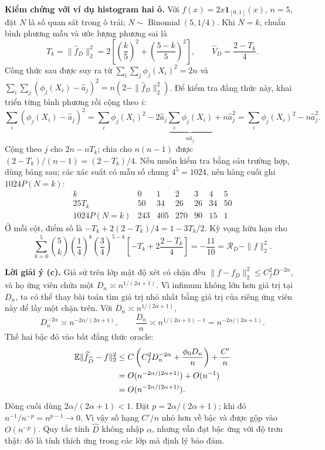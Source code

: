 \textbf{Kiểm chứng với ví dụ histogram hai ô.} Với $f(x)=2x\mathbf1_{[0,1]}(x)$,
$n=5$, đặt $N$ là số quan sát trong ô trái; $N\sim\operatorname{Binomial}(5,1/4)$.
Khi $N=k$, chuẩn bình phương mẫu và ước lượng phương sai là
\[
T_k=\|\widehat f_D\|_2^2=2\left[\left(\frac k5\right)^2+
\left(\frac{5-k}{5}\right)^2\right],\qquad
\widehat V_D=\frac{2-T_k}{4}.
\]
Công thức sau được suy ra từ $\sum_i\sum_j\phi_j(X_i)^2=2n$ và
$\sum_i\sum_j(\phi_j(X_i)-\widehat a_j)^2=n(2-\|\widehat f_D\|_2^2)$.
Để kiểm tra đẳng thức này, khai triển từng bình phương rồi cộng theo $i$:
\[
\sum_i(\phi_j(X_i)-\widehat a_j)^2
=\sum_i\phi_j(X_i)^2-2\widehat a_j\underbrace{\sum_i\phi_j(X_i)}_{n\widehat a_j}
+n\widehat a_j^2
=\sum_i\phi_j(X_i)^2-n\widehat a_j^2.
\]
Cộng theo $j$ cho $2n-nT_k$; chia cho $n(n-1)$ được
$(2-T_k)/(n-1)=(2-T_k)/4$.
Nếu muốn kiểm tra bằng sáu trường hợp, dùng bảng sau;
các xác suất có mẫu số chung $4^5=1024$, nên hàng cuối ghi $1024P(N=k)$:
\[
\begin{array}{c|rrrrrr}
k&0&1&2&3&4&5\\\hline
25T_k&50&34&26&26&34&50\\
1024P(N=k)&243&405&270&90&15&1
\end{array}
\]
Ở mỗi cột, điểm số là $-T_k+2(2-T_k)/4=1-3T_k/2$.
Kỳ vọng hữu hạn cho
\[
\sum_{k=0}^5\binom5k\left(\frac14\right)^k\left(\frac34\right)^{5-k}
\left[-T_k+2\frac{2-T_k}{4}\right]
=-\frac{11}{10}=\mathcal R_D-\|f\|_2^2.
\]

\textbf{Lời giải ý (c).}
Giả sử trên lớp mật độ xét có chặn đều
$\|f-f_D\|_2^2\leq C_f^2D^{-2\alpha}$,
và họ ứng viên chứa một $D_n\asymp n^{1/(2\alpha+1)}$.
Vì infimum không lớn hơn giá trị tại $D_n$,
ta có thể thay bài toán tìm giá trị nhỏ nhất bằng giá trị của riêng ứng viên này
để lấy một chặn trên. Với $D_n\asymp n^{1/(2\alpha+1)}$,
\[
D_n^{-2\alpha}\asymp n^{-2\alpha/(2\alpha+1)},\qquad
\frac{D_n}{n}\asymp n^{1/(2\alpha+1)-1}
=n^{-2\alpha/(2\alpha+1)}.
\]
Thế hai bậc đó vào bất đẳng thức oracle:
\begin{align*}
\mathbb E\|\widehat f_{\widehat D}-f\|_2^2
&\leq C\left(C_f^2D_n^{-2\alpha}+\frac{\phi_0D_n}{n}\right)+\frac{C'}n\\
&=O(n^{-2\alpha/(2\alpha+1)})+O(n^{-1})\\
&=O(n^{-2\alpha/(2\alpha+1)}).
\end{align*}
Dòng cuối dùng $2\alpha/(2\alpha+1)<1$.
Đặt $p=2\alpha/(2\alpha+1)$; khi đó $n^{-1}/n^{-p}=n^{p-1}\to0$.
Vì vậy số hạng $C'/n$ nhỏ hơn về bậc và được gộp vào $O(n^{-p})$.
Quy tắc tính $\widehat D$ không nhập $\alpha$, nhưng vẫn đạt bậc ứng với độ trơn thật:
đó là tính thích ứng trong các lớp mà định lý bảo đảm.

